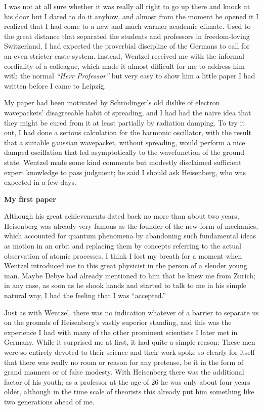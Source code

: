 \documentclass[12pt]{article}
\begin{document}
I was not at all sure whether it was really all right to go up there and knock at his door but I dared to do it anyhow, and almost from the moment he opened it I realized that I had come to a new and much warmer academic climate. Used to the great distance that separated the students and professors in freedom-loving Switzerland, I had expected the proverbial discipline of the Germans to call for an even stricter caste system. Instead, Wentzel received me with the informal cordiality of a colleague, which made it almost difficult for me to address him
with the normal {\it ``Herr Professor''} but very easy to show him a little paper I had written before I came to Leipzig.

My paper had been motivated by Schr\"odinger's old dislike of electron wavepackets' disagreeable habit of spreading, and I had had the naive idea that they might be cured from it at least partially by radiation damping. To try it out, I had done a serious calculation for the harmonic oscillator, with the result that a suitable gaussian wavepacket,
without spreading, would perform a nice damped oscillation that led asymptotically to the wavefunction of the ground state. Wentzel made some kind comments but modestly disclaimed sufficient expert knowledge to pass judgment; he said I should ask Heisenberg, who was expected in a few days.

\bigskip
\noindent
{\bf My first paper}

\smallskip
Although his great achievements dated back no more than about two years, Heisenberg was already very famous as the founder of the new form of mechanics, which accounted for quantum phenomena by abandoning such fundamental ideas as motion in an orbit and replacing them by concepts referring to the actual observation of atomic processes. I think I lost my breath for a moment when Wentzel introduced me to this great physicist in the person of a slender young man. Maybe Debye had already mentioned to him that he knew me from Zurich; in any case, as soon as he shook hands and started to talk to me in his simple natural way, I had the feeling that I was ``accepted.''

Just as with Wentzel, there was no indication whatever of a barrier to separate us on the grounds of Heisenberg's vastly superior standing, and this was the experience I had with many of the other prominent scientists I later met in Germany. While it surprised me at first, it had quite a simple reason: These men were so entirely devoted to their science and their work spoke so clearly for itself that there was really no room or reason for any pretense, be it in the form of grand manners or of false modesty. With Heisenberg there was the additional factor of his youth; as a professor at the age of 26 he was only about four years older,
although in the time scale of theorists this already put him something like two generations ahead of me.
\end{document}
